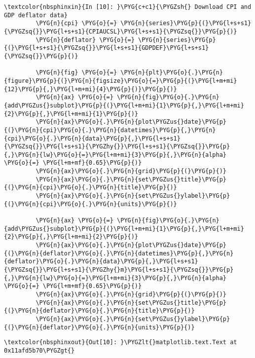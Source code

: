 \documentclass[letterpaper,10pt,openany,oneside,english]{sphinxmanual}
\begin{document}
\begin{Verbatim}[commandchars=\\\{\}]
\textcolor{nbsphinxin}{In [10]: }\PYG{c+c1}{\PYGZsh{} Download CPI and GDP deflator data}
         \PYG{n}{cpi} \PYG{o}{=} \PYG{n}{series}\PYG{p}{(}\PYG{l+s+s1}{\PYGZsq{}}\PYG{l+s+s1}{CPIAUCSL}\PYG{l+s+s1}{\PYGZsq{}}\PYG{p}{)}
         \PYG{n}{deflator} \PYG{o}{=} \PYG{n}{series}\PYG{p}{(}\PYG{l+s+s1}{\PYGZsq{}}\PYG{l+s+s1}{GDPDEF}\PYG{l+s+s1}{\PYGZsq{}}\PYG{p}{)}
         
         \PYG{n}{fig} \PYG{o}{=} \PYG{n}{plt}\PYG{o}{.}\PYG{n}{figure}\PYG{p}{(}\PYG{n}{figsize}\PYG{o}{=}\PYG{p}{(}\PYG{l+m+mi}{12}\PYG{p}{,}\PYG{l+m+mi}{4}\PYG{p}{)}\PYG{p}{)}
         \PYG{n}{ax} \PYG{o}{=} \PYG{n}{fig}\PYG{o}{.}\PYG{n}{add\PYGZus{}subplot}\PYG{p}{(}\PYG{l+m+mi}{1}\PYG{p}{,}\PYG{l+m+mi}{2}\PYG{p}{,}\PYG{l+m+mi}{1}\PYG{p}{)}
         \PYG{n}{ax}\PYG{o}{.}\PYG{n}{plot\PYGZus{}date}\PYG{p}{(}\PYG{n}{cpi}\PYG{o}{.}\PYG{n}{datetimes}\PYG{p}{,}\PYG{n}{cpi}\PYG{o}{.}\PYG{n}{data}\PYG{p}{,}\PYG{l+s+s1}{\PYGZsq{}}\PYG{l+s+s1}{\PYGZhy{}}\PYG{l+s+s1}{\PYGZsq{}}\PYG{p}{,}\PYG{n}{lw}\PYG{o}{=}\PYG{l+m+mi}{3}\PYG{p}{,}\PYG{n}{alpha} \PYG{o}{=} \PYG{l+m+mf}{0.65}\PYG{p}{)}
         \PYG{n}{ax}\PYG{o}{.}\PYG{n}{grid}\PYG{p}{(}\PYG{p}{)}
         \PYG{n}{ax}\PYG{o}{.}\PYG{n}{set\PYGZus{}title}\PYG{p}{(}\PYG{n}{cpi}\PYG{o}{.}\PYG{n}{title}\PYG{p}{)}
         \PYG{n}{ax}\PYG{o}{.}\PYG{n}{set\PYGZus{}ylabel}\PYG{p}{(}\PYG{n}{cpi}\PYG{o}{.}\PYG{n}{units}\PYG{p}{)}
         
         \PYG{n}{ax} \PYG{o}{=} \PYG{n}{fig}\PYG{o}{.}\PYG{n}{add\PYGZus{}subplot}\PYG{p}{(}\PYG{l+m+mi}{1}\PYG{p}{,}\PYG{l+m+mi}{2}\PYG{p}{,}\PYG{l+m+mi}{2}\PYG{p}{)}
         \PYG{n}{ax}\PYG{o}{.}\PYG{n}{plot\PYGZus{}date}\PYG{p}{(}\PYG{n}{deflator}\PYG{o}{.}\PYG{n}{datetimes}\PYG{p}{,}\PYG{n}{deflator}\PYG{o}{.}\PYG{n}{data}\PYG{p}{,}\PYG{l+s+s1}{\PYGZsq{}}\PYG{l+s+s1}{\PYGZhy{}m}\PYG{l+s+s1}{\PYGZsq{}}\PYG{p}{,}\PYG{n}{lw}\PYG{o}{=}\PYG{l+m+mi}{3}\PYG{p}{,}\PYG{n}{alpha} \PYG{o}{=} \PYG{l+m+mf}{0.65}\PYG{p}{)}
         \PYG{n}{ax}\PYG{o}{.}\PYG{n}{grid}\PYG{p}{(}\PYG{p}{)}
         \PYG{n}{ax}\PYG{o}{.}\PYG{n}{set\PYGZus{}title}\PYG{p}{(}\PYG{n}{deflator}\PYG{o}{.}\PYG{n}{title}\PYG{p}{)}
         \PYG{n}{ax}\PYG{o}{.}\PYG{n}{set\PYGZus{}ylabel}\PYG{p}{(}\PYG{n}{deflator}\PYG{o}{.}\PYG{n}{units}\PYG{p}{)}
\end{Verbatim}

\begin{Verbatim}[commandchars=\\\{\}]
\textcolor{nbsphinxout}{Out[10]: }\PYGZlt{}matplotlib.text.Text at 0x11afd5b70\PYGZgt{}
\end{Verbatim}
\end{document}
